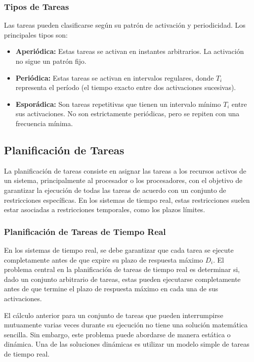 \documentclass[a4paper,12pt]{article}
\begin{document}
\subsubsection{Tipos de Tareas}

Las tareas pueden clasificarse según su patrón de activación y periodicidad. Los principales tipos son:

\begin{itemize}
    \item \textbf{Aperiódica:} Estas tareas se activan en instantes arbitrarios. La activación no sigue un patrón fijo.
    \item \textbf{Periódica:} Estas tareas se activan en intervalos regulares, donde \(T_i\) representa el período (el tiempo exacto entre dos activaciones sucesivas).
    \item \textbf{Esporádica:} Son tareas repetitivas que tienen un intervalo mínimo \(T_i\) entre sus activaciones. No son estrictamente periódicas, pero se repiten con una frecuencia mínima.
\end{itemize}


\subsection{Planificación de Tareas}

La planificación de tareas consiste en asignar las tareas a los recursos activos de un sistema, principalmente al procesador o los procesadores, con el objetivo de garantizar la ejecución de todas las tareas de acuerdo con un conjunto de restricciones específicas. En los sistemas de tiempo real, estas restricciones suelen estar asociadas a restricciones temporales, como los plazos límites.

\subsubsection{Planificación de Tareas de Tiempo Real}

En los sistemas de tiempo real, se debe garantizar que cada tarea se ejecute completamente antes de que expire su plazo de respuesta máximo \(D_i\). El problema central en la planificación de tareas de tiempo real es determinar si, dado un conjunto arbitrario de tareas, estas pueden ejecutarse completamente antes de que termine el plazo de respuesta máximo en cada una de sus activaciones.

El cálculo anterior para un conjunto de tareas que pueden interrumpirse mutuamente varias veces durante su ejecución no tiene una solución matemática sencilla. Sin embargo, este problema puede abordarse de manera estática o dinámica. Una de las soluciones dinámicas es utilizar un modelo simple de tareas de tiempo real.
\end{document}
